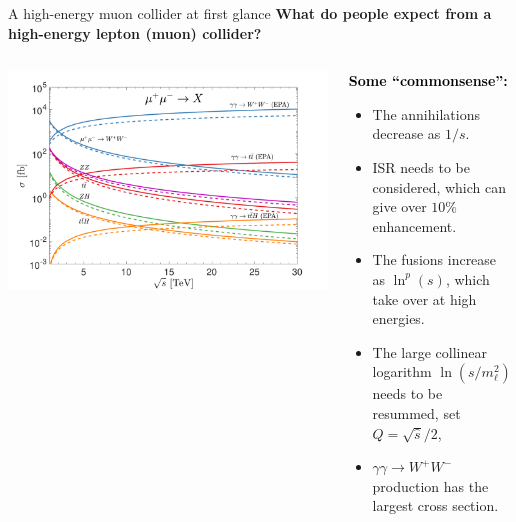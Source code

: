 \documentclass[aspectratio=169]{beamer}
\begin{document}
\begin{frame}{A high-energy muon collider at first glance}
	\vspace{-2mm}\textcolor{PittRoyal}{\bf What do people expect from a high-energy lepton (muon) collider?}\\
		\vspace*{2mm}
		\begin{columns}
		\begin{column}{0.5\textwidth}
		\includegraphics[width=1\textwidth]{figs/sigma_FO2}
		\vspace{3pt}\hspace{40mm}
		\end{column}
		\begin{column}{0.5\textwidth}
			\textcolor{black}{\bf Some ``commonsense'':}
			\begin{itemize}
				\item The annihilations decrease as $1/s$.
				\item ISR needs to be considered, which can give over $10\%$ enhancement.
				\item The fusions increase as $\ln^p(s)$, which take over at high energies.
				\item The large collinear logarithm $\ln(s/m_\ell^2)$ needs to be resummed, set $Q={\sqrt {\hat s}}/2$,
				\item $\gamma\gamma \to W^+W^-$ production has the largest cross section.
			\end{itemize}
		\end{column}
	\end{columns}
\end{frame}
\end{document}
